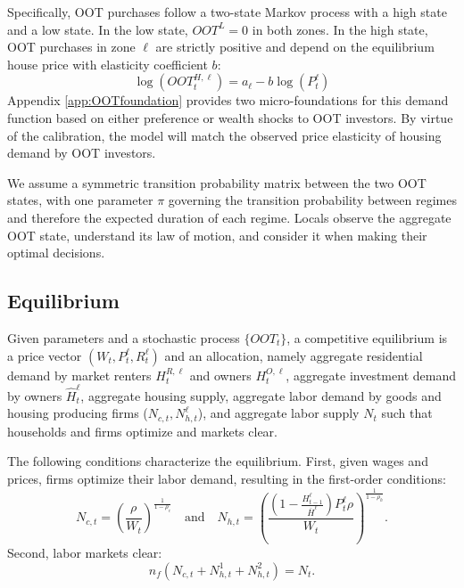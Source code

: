 \documentclass[letterpaper,12pt,dvipsnames,usenames]{article}
\theoremstyle{definition}
\begin{document}
\begin{spacing}{1.25}
Specifically,  OOT purchases  follow a two-state Markov process with a high state and a low state. In the low state, $OOT^{L}=0$ in both zones. In the high state, OOT purchases in zone $\ell$ are strictly positive and depend on the equilibrium house price with elasticity coefficient $b$:
\begin{equation}
\log\left(OOT_t^{H,\ell}\right) = a_{\ell} - b\log\left(P_t^{\ell}\right) \label{eq:OOT}
\end{equation}
Appendix \ref{app:OOTfoundation} provides two micro-foundations for this demand function based on either preference or wealth shocks to OOT investors. By virtue of the calibration, the model will match the observed price elasticity of housing demand by OOT investors.

We assume a symmetric transition probability matrix between the two OOT states, with one parameter $\pi$ governing the transition probability between regimes and therefore the expected duration of each regime.
Locals observe the aggregate OOT state, understand its law of motion, and consider it when making their optimal decisions.

\subsection{Equilibrium}

Given parameters and a stochastic process $\{OOT_t\}$, a competitive equilibrium is a price vector $(W_{t},P^{\ell}_{t},R^{\ell}_{t})$ and an allocation, namely aggregate residential demand by market renters $H^{R,\ell}_{t}$ and owners $H^{O,\ell}_{t}$, aggregate investment demand by owners $\widehat{H}^{\ell}_{t}$, aggregate housing supply, aggregate labor demand by goods and housing producing firms ($N_{c,t},N_{h,t}^{\ell}$), and aggregate labor supply $N_{t}$ such that households and firms optimize and markets clear.


The following conditions characterize the equilibrium. First, given wages and prices, firms optimize their labor demand, resulting in the first-order conditions:
\begin{equation}
N_{c,t}=\left(\frac{\rho_{}}{W_{t}}\right)^{\frac{1}{1-\rho_{c}}} \quad\text{and}\quad N_{h,t}=\left(\frac{\left(1-\frac{H_{t-1}^{\ell}}{\overline{H}^{\ell}}\right) P_{t}^{\ell} \rho }{W_{t}}\right)^{\frac{1}{1-\rho_{h}}}. \label{eq:foclabor}
\end{equation}Second, labor markets clear:
\begin{equation}
n_{f}\left(N_{c,t}+N^{1}_{h,t}+N^{2}_{h,t}\right)=N_{t}.
\end{equation}


\end{spacing}
\end{document}
